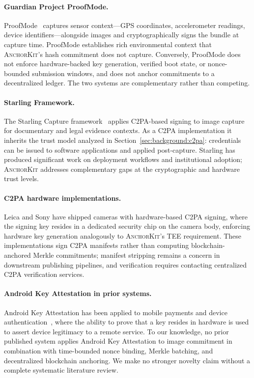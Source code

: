 \documentclass[11pt,a4paper]{article}
\newcommand{\AK}{\textsc{AnchorKit}\xspace}
\begin{document}
\paragraph{Guardian Project ProofMode.}
ProofMode~\cite{proofmode} captures sensor context---GPS coordinates,
accelerometer readings, device identifiers---alongside images and
cryptographically signs the bundle at capture time.  ProofMode establishes rich
environmental context that \AK's hash commitment does not capture.  Conversely,
ProofMode does not enforce hardware-backed key generation, verified boot state,
or nonce-bounded submission windows, and does not anchor commitments to a
decentralized ledger.  The two systems are complementary rather than competing.

\paragraph{Starling Framework.}
The Starling Capture framework~\cite{starling} applies C2PA-based signing to
image capture for documentary and legal evidence contexts.  As a C2PA
implementation it inherits the trust model analyzed in
Section~\ref{sec:background:c2pa}: credentials can be issued to software
applications and applied post-capture.  Starling has produced significant work
on deployment workflows and institutional adoption; \AK addresses complementary
gaps at the cryptographic and hardware trust levels.

\paragraph{C2PA hardware implementations.}
Leica and Sony have shipped cameras with hardware-based C2PA signing, where the
signing key resides in a dedicated security chip on the camera body, enforcing
hardware key generation analogously to \AK's TEE requirement.  These
implementations sign C2PA manifests rather than computing blockchain-anchored
Merkle commitments; manifest stripping remains a concern in downstream
publishing pipelines, and verification requires contacting centralized C2PA
verification services.

\paragraph{Android Key Attestation in prior systems.}
Android Key Attestation has been applied to mobile payments and device
authentication~\cite{android-attestation}, where the ability to prove that a
key resides in hardware is used to assert device legitimacy to a remote service.
To our knowledge, no prior published system applies Android Key Attestation to
image commitment in combination with time-bounded nonce binding, Merkle batching,
and decentralized blockchain anchoring.  We make no stronger novelty claim
without a complete systematic literature review.
\end{document}
